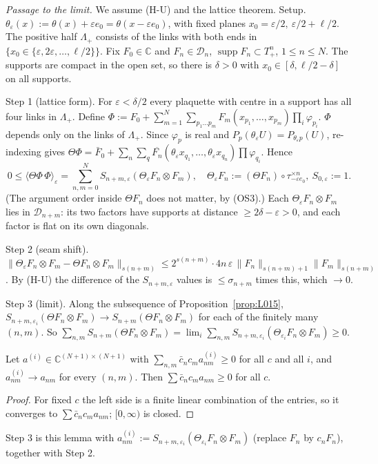 \emph{Passage to the limit.} We assume (H-U) and the lattice theorem.
Setup. $\theta_\varepsilon(x):=\theta(x)+\varepsilon e_0=\theta(x-\varepsilon e_0)$, with fixed planes $x_0=\varepsilon/2,\ \varepsilon/2+\ell/2$. The positive half $\Lambda_+$ consists of the links with both ends in $\{x_0\in\{\varepsilon,2\varepsilon,\dots,\ell/2\}\}$. Fix $F_0\in\mathbb C$ and $F_n\in\mathcal D_n$, $\operatorname{supp}F_n\subset T_+^n$, $1\le n\le N$. The supports are compact in the open set, so there is $\delta>0$ with $x_0\in[\delta,\ell/2-\delta]$ on all supports.

Step 1 (lattice form). For $\varepsilon<\delta/2$ every plaquette with centre in a support has all four links in $\Lambda_+$. Define $\Phi:=F_0+\sum_{m=1}^N\sum_{p_1\dots p_m}F_m(x_{p_1},\dots,x_{p_m})\prod_i\varphi_{p_i}$. $\Phi$ depends only on the links of $\Lambda_+$. Since $\varphi_p$ is real and $P_p(\theta_\varepsilon U)=P_{\theta_\varepsilon p}(U)$, re-indexing gives $\Theta\Phi=\bar F_0+\sum_n\sum_q\overline{F_n}(\theta_\varepsilon x_{q_1},\dots,\theta_\varepsilon x_{q_n})\prod\varphi_{q_i}$. Hence
\[0\le\langle\Theta\Phi\,\Phi\rangle_\varepsilon=\sum_{n,m=0}^NS_{n+m,\varepsilon}(\Theta_\varepsilon F_n\otimes F_m),\quad\Theta_\varepsilon F_n:=(\Theta F_n)\circ\tau_{-\varepsilon e_0}^{\times n},\ S_{0,\varepsilon}:=1.\]
(The argument order inside $\Theta F_n$ does not matter, by (OS3).) Each $\Theta_\varepsilon F_n\otimes F_m$ lies in $\mathcal D_{n+m}$: its two factors have supports at distance $\ge2\delta-\varepsilon>0$, and each factor is flat on its own diagonals.

Step 2 (seam shift). $\|\Theta_\varepsilon F_n\otimes F_m-\Theta F_n\otimes F_m\|_{s(n+m)}\le2^{s(n+m)}\cdot4n\,\varepsilon\,\|F_n\|_{s(n+m)+1}\|F_m\|_{s(n+m)}$. By (H-U) the difference of the $S_{n+m,\varepsilon}$ values is $\le\sigma_{n+m}$ times this, which $\to0$.

Step 3 (limit). Along the subsequence of Proposition~\ref{prop:L015}, $S_{n+m,\varepsilon_i}(\Theta F_n\otimes F_m)\to S_{n+m}(\Theta F_n\otimes F_m)$ for each of the finitely many $(n,m)$. So $\sum_{n,m}S_{n+m}(\Theta F_n\otimes F_m)=\lim_i\sum_{n,m}S_{n+m,\varepsilon_i}(\Theta_{\varepsilon_i}F_n\otimes F_m)\ge0$.

\begin{lemma}\label{lem:L016}
Let $a^{(i)}\in\mathbb C^{(N+1)\times(N+1)}$ with $\sum_{n,m}\bar c_nc_ma^{(i)}_{nm}\ge0$ for all $c$ and all $i$, and $a^{(i)}_{nm}\to a_{nm}$ for every $(n,m)$. Then $\sum\bar c_nc_ma_{nm}\ge0$ for all $c$.
\end{lemma}
\begin{proof}
For fixed $c$ the left side is a finite linear combination of the entries, so it converges to $\sum\bar c_nc_ma_{nm}$; $[0,\infty)$ is closed.
\end{proof}
Step 3 is this lemma with $a^{(i)}_{nm}:=S_{n+m,\varepsilon_i}(\Theta_{\varepsilon_i}F_n\otimes F_m)$ (replace $F_n$ by $c_nF_n$), together with Step 2.

